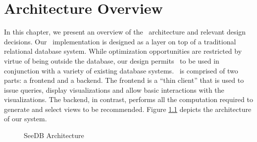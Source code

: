 \chapter{Architecture Overview}
\label{sec:system_architecture}

In this chapter, we present an overview of the \SeeDB\ architecture and
relevant design decisions.
Our \SeeDB\ implementation is designed as a layer on top of a traditional
relational database system.
While optimization opportunities are restricted by virtue of being outside the
database, our design permits \SeeDB\ to be used in conjunction with a variety of
existing database systems. 
\SeeDB\ is comprised of two parts: a frontend and a backend. 
The frontend is a ``thin client'' that
is used to issue queries, display visualizations and allow basic interactions
with the visualizations.
The backend, in contrast, performs all the computation required to generate and select views
to be recommended. Figure \ref{fig:sys-arch}
depicts the architecture of our system.

\begin{figure}[htb]
\vspace{-10pt}
\centerline{
\hbox{}}
\caption{SeeDB Architecture}
\label{fig:sys-arch}
\vspace{-12pt}
\end{figure} 

